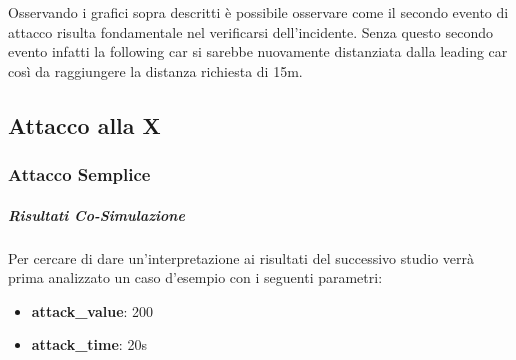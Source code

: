 Osservando i grafici sopra descritti è possibile osservare come il secondo evento di attacco risulta fondamentale nel verificarsi dell'incidente. Senza questo secondo evento infatti la following car si sarebbe nuovamente distanziata dalla leading car così da raggiungere la distanza richiesta di 15m.

\subsection{Attacco alla X}
\subsubsection{Attacco Semplice}
\subparagraph{Risultati Co-Simulazione}
Per cercare di dare un'interpretazione ai risultati del successivo studio verrà prima analizzato un caso d'esempio con i seguenti parametri:
\begin{itemize}
	\item \textbf{attack\_value}: 200
	\item \textbf{attack\_time}: 20s
\end{itemize}

